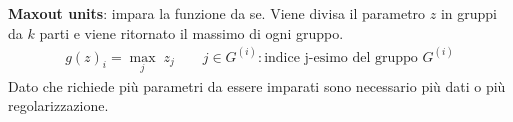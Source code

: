 
\textbf{Maxout units}: impara la funzione da se.
Viene divisa il parametro $z$ in gruppi da $k$ parti e viene ritornato il massimo di ogni gruppo.
%
\begin{align*}
  g(z)_i = \underset{j}{\max} \; z_j \qquad j \in G^{(i)}: \text{indice j-esimo del gruppo $G^{(i)}$}
\end{align*}
%
Dato che richiede più parametri da essere imparati sono necessario più dati o più regolarizzazione.
